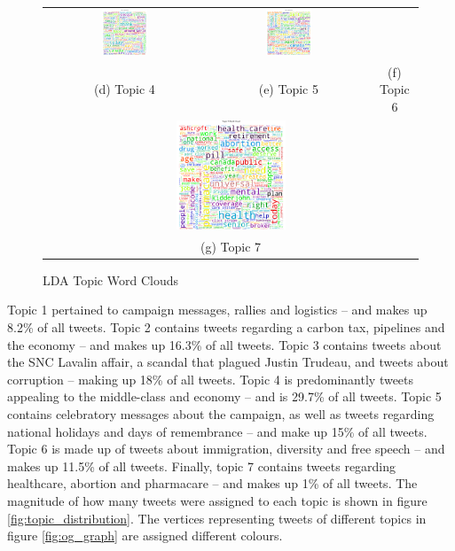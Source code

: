 \begin{singlespacing}
\begin{figure}
\begin{tabular}{ccc}
        \includegraphics[width=0.30\textwidth]{Figures/topic_5_wordcloud} &
        \includegraphics[width=0.30\textwidth]{Figures/topic_6_wordcloud} \\
        (d) Topic 4 & (e) Topic 5 & (f) Topic 6  \\[6pt]
        \multicolumn{3}{c}{\includegraphics[width=0.30\textwidth]{Figures/topic_7_wordcloud}
        }\\
        \multicolumn{3}{c}{(g) Topic 7}
        \end{tabular}
        \caption[LDA Topic Word Clouds]{LDA Topic Word Clouds}
        \label{fig:topic_word_clouds}
    \end{figure}
\end{singlespacing}

Topic 1 pertained to campaign messages, rallies and logistics -- and makes up
8.2\% of all tweets. Topic 2 contains tweets regarding a carbon tax, pipelines
and the economy -- and makes up 16.3\% of all tweets. Topic 3 contains tweets
about the SNC Lavalin affair, a scandal that plagued Justin Trudeau, and tweets
about corruption -- making up 18\% of all tweets. Topic 4 is predominantly
tweets appealing to the middle-class and economy -- and is 29.7\% of all tweets.
Topic 5 contains celebratory messages about the campaign, as well as tweets
regarding national holidays and days of remembrance -- and make up 15\% of all
tweets. Topic 6 is made up of tweets about immigration, diversity and free
speech -- and makes up 11.5\% of all tweets. Finally, topic 7 contains tweets
regarding healthcare, abortion and pharmacare -- and makes up 1\% of all tweets.
The magnitude of how many tweets were assigned to each topic is shown in figure
\ref{fig:topic_distribution}. The vertices representing tweets of different
topics in figure \ref{fig:og_graph} are assigned different colours. 


